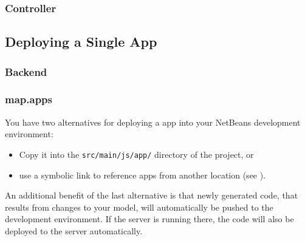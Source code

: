 \subsubsection{Controller} 
\label{subsubsec:Controller}



\subsection{Deploying a Single App}
\label{subsec:SingleAppDep}

\subsubsection{Backend} 
\label{subsubsec:Backend}

\subsubsection{map.apps} 
\label{subsubsec:mapapps}

You have two alternatives for deploying a \mapapps app into your NetBeans development environment:
\begin{itemize}
\item Copy it into the \lstinline[language=Simple]|src/main/js/app/| directory of the project, or
\item use a symbolic link to reference apps from another location (see ).
\end{itemize} 

An additional benefit of the last alternative is that newly generated code, that results from changes to your model, will automatically be pushed to the \mapapps development environment. If the server is running there, the code will also be deployed to the server automatically.
